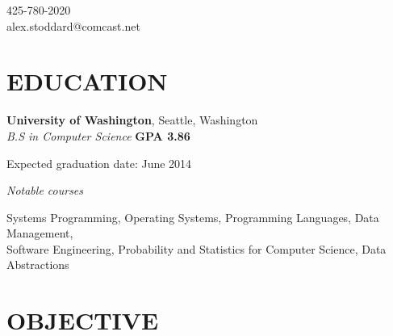\documentclass[margin,line]{resume}
\begin{document}
{
    \sc
    \hfill 425-780-2020                   \vspace{0mm}\\\vspace{0mm}%
    \hfill alex.stoddard@comcast.net         \vspace{0mm}\\\vspace{0mm}%
}

\begin{resume}

    \section{\mysidestyle \textbf{\large{E}\small{DUCATION}}}

    \textbf{\listing University of Washington}, Seattle, Washington \vspace{2mm}\\\vspace{1mm}%
    \textsl{B.S in Computer Science} \hfill \textbf{ GPA 3.86 }\vspace{-3mm}\\\vspace{-1mm}%
    \begin{list2}
        \item Expected graduation date: June 2014
    \end{list2}\vspace{-1.5mm}
    \textsl{Notable courses}\vspace{-3mm}\\\vspace{-1mm}%
    \begin{list2}
        \item Systems Programming, Operating Systems, Programming Languages, Data Management,\\
              Software Engineering, Probability and Statistics for Computer Science, Data Abstractions\\
    \end{list2}\vspace{-1.5mm}

\sectionline

    \section{\mysidestyle \textbf{\large{O}\small{BJECTIVE}}}


\end{resume}
\end{document}
